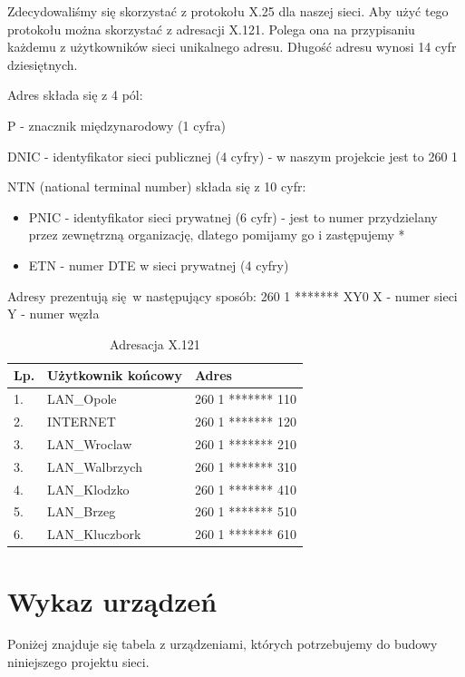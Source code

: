 \documentclass[a4paper]{article}
\begin{document}
Zdecydowaliśmy się skorzystać z protokołu X.25 dla naszej sieci. Aby użyć tego protokołu można skorzystać z adresacji X.121. Polega ona na przypisaniu każdemu z użytkowników sieci unikalnego adresu. Długość adresu wynosi 14 cyfr dziesiętnych.

Adres składa się z 4 pól:

P - znacznik międzynarodowy (1 cyfra)

DNIC - identyfikator sieci publicznej (4 cyfry) - w naszym projekcie jest to 260 1

NTN (national terminal number) składa się z 10 cyfr:
\begin{itemize}
\item PNIC - identyfikator sieci prywatnej (6 cyfr) - jest to numer przydzielany przez zewnętrzną organizację, dlatego pomijamy go i zastępujemy *
\item ETN - numer DTE w sieci prywatnej (4 cyfry)
\end{itemize}

Adresy prezentują się w następujący sposób:
260 1 ******* XY0
X - numer sieci
Y - numer węzła

\begin{table}[H]
	\centering
	\caption{Adresacja X.121}
	\begin{tabular}{lll}
		\hline
		Lp. & Użytkownik końcowy & Adres \\
        \hline
1. & LAN\_Opole & 260 1 ******* 110 \\
2. & INTERNET & 260 1 ******* 120 \\
3. & LAN\_Wroclaw & 260 1 ******* 210 \\
3. & LAN\_Walbrzych & 260 1 ******* 310 \\
4. & LAN\_Klodzko & 260 1 ******* 410 \\
5. & LAN\_Brzeg & 260 1 ******* 510 \\
6. & LAN\_Kluczbork & 260 1 ******* 610 \\
        \hline
	\end{tabular}	
\end{table}

\section{Wykaz urządzeń}

Poniżej znajduje się tabela z urządzeniami, których potrzebujemy do budowy niniejszego projektu sieci.
\end{document}
